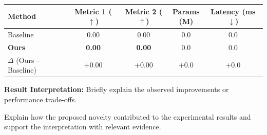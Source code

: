 \documentclass[8pt,a4paper]{article}
\begin{document}
\begin{center}


\label{tab:results}

\small

\begin{tabularx}{\linewidth}{
    @{}X c c c c@{}
}

\toprule

\textbf{Method}
&
\makecell{\textbf{Metric 1}\\($\uparrow$)}
&
\makecell{\textbf{Metric 2}\\($\uparrow$)}
&
\makecell{\textbf{Params}\\(M)}
&
\makecell{\textbf{Latency}\\(ms $\downarrow$)}
\\

\midrule

Baseline
&
0.00
&
0.00
&
0.0
&
0.0
\\

\textbf{Ours}
&
\textbf{0.00}
&
\textbf{0.00}
&
0.0
&
0.0
\\

\midrule

$\Delta$ (Ours -- Baseline)
&
+0.00
&
+0.00
&
+0.0
&
+0.0
\\

\bottomrule

\end{tabularx}

\end{center}

\vspace{-5pt}

\textbf{Result Interpretation:}
Briefly explain the observed improvements
or performance trade-offs.

Explain how the proposed novelty contributed
to the experimental results and support
the interpretation with relevant evidence.
\end{document}
